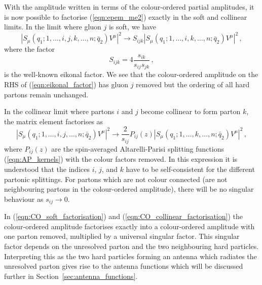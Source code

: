 \documentclass[main.tex]{subfiles}
\begin{document}
    With the amplitude written in terms of the colour-ordered
    partial amplitudes, it is now possible to factorise (\ref{eqn:epem_me2})
    exactly in the soft and collinear limits. In the limit where gluon
    $j$ is soft, we have
    \begin{equation}\label{eqn:CO_soft_factorisation}
        \left|S_{\mu}(q_{1};1,\ldots,i,j,k,\ldots,n;\bar{q}_{2})V^{\mu}\right|^{2} \rightarrow S_{ijk} \left|S_{\mu}(q_{1};1,\ldots,i,k,\ldots,n;\bar{q}_{2})V^{\mu}\right|^{2} \, ,
    \end{equation}
    where the factor
    \begin{equation}\label{eqn:eikonal_factor}
        S_{ijk} = 4\dfrac{s_{ik}}{s_{ij}s_{jk}} \, ,
    \end{equation}
    is the well-known eikonal factor. We see that the colour-ordered
    amplitude on the RHS of (\ref{eqn:eikonal_factor}) has gluon $j$
    removed but the ordering of all hard partons remain unchanged.

    In the collinear limit where partons $i$ and $j$ become collinear
    to form parton $k$, the matrix element factorises as
    \begin{equation}\label{eqn:CO_collinear_factorisation}
        \left|S_{\mu}(q_{1};1,\ldots,i,j,\ldots,n;\bar{q}_{2})V^{\mu}\right|^{2} \rightarrow \dfrac{2}{s_{ij}}P_{ij}(z) \left|S_{\mu}(q_{1};1,\ldots,k,\ldots,n;\bar{q}_{2})V^{\mu}\right|^{2} \, ,
    \end{equation}
    where $P_{ij}(z)$ are the spin-averaged Altarelli-Parisi splitting
    functions (\ref{eqn:AP_kernels}) with the colour factors removed.
    In this expression it is understood that the indices $i$, $j$, and $k$
    have to be self-consistent for the different partonic splittings.
    For partons which are not colour connected (are not neighbouring
    partons in the colour-ordered amplitude), there will be no singular
    behaviour as $s_{ij} \rightarrow 0$.

    In (\ref{eqn:CO_soft_factorisation}) and (\ref{eqn:CO_collinear_factorisation})
    the colour-ordered amplitude factorises exactly into a
    colour-ordered amplitude with one parton removed, multiplied
    by a universal singular factor. This singular factor depends on the unresolved
    parton and the two neighbouring hard particles. Interpreting this as
    the two hard particles forming an antenna which radiates the unresolved
    parton gives rise to the antenna functions which will be discussed
    further in Section~\ref{sec:antenna_functions}.
\end{document}
